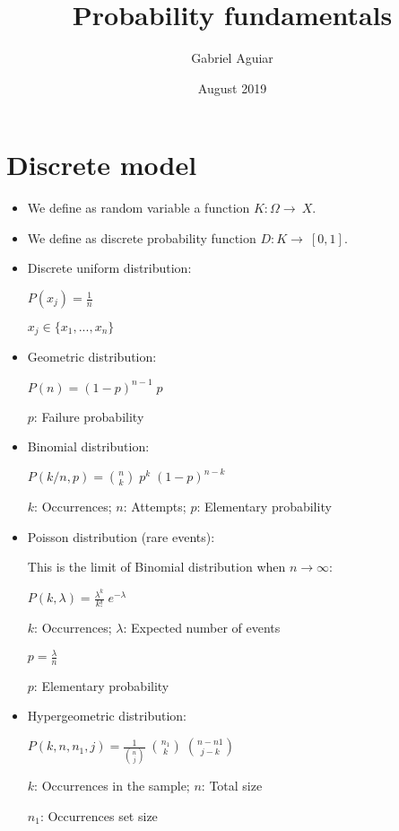\documentclass{article}
\title{Probability fundamentals}
\author{Gabriel Aguiar}
\date{August 2019}
\begin{document}
\maketitle

\section{Discrete model}

\begin{itemize}

\item We define as random variable a function $K: \Omega \rightarrow\ X$.

\item We define as discrete probability function $D: K \rightarrow\ [0, 1]$.

\item Discrete uniform distribution:

$P( x_{j} ) = \frac{1}{n}$

$x_{j} \in\{x_{1},..., x_{n}\}$

\item Geometric distribution:

$P(n) = (1 - p)^{n - 1} \; p$

$p$: Failure probability

\item Binomial distribution:

$P(k/n,p) = \binom{n}{k} \; p^{k} \; (1 - p)^{n - k}$

$k$: Occurrences; $n$: Attempts; $p$: Elementary probability

\item Poisson distribution (rare events):

This is the limit of Binomial distribution when $n \rightarrow \infty$:

$P(k,\lambda) = \frac{\lambda^{k}}{k!} \; e^{-\lambda}$

$k$: Occurrences; $\lambda$: Expected number of events

$p = \frac{\lambda}{n}$

$p$: Elementary probability

\item Hypergeometric distribution:

$P(k,n,n_{1},j) = \frac{1}{\binom{n}{j}} \; \binom{n_{1}}{k} \; \binom{n - n{1}}{j - k}$

$k$: Occurrences in the sample; $n$: Total size

$n_{1}$: Occurrences set size


\end{itemize}
\end{document}
